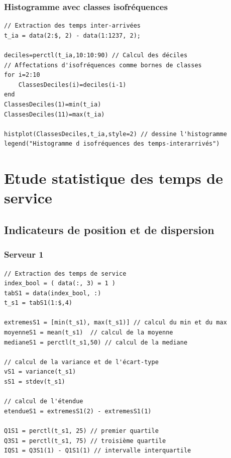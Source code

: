 \documentclass{article}
\begin{document}
\subsubsection{Histogramme avec classes isofréquences}
\begin{verbatim}
// Extraction des temps inter-arrivées
t_ia = data(2:$, 2) - data(1:1237, 2);

deciles=perctl(t_ia,10:10:90) // Calcul des déciles
// Affectations d'isofréquences comme bornes de classes
for i=2:10
    ClassesDeciles(i)=deciles(i-1)
end
ClassesDeciles(1)=min(t_ia)
ClassesDeciles(11)=max(t_ia)

histplot(ClassesDeciles,t_ia,style=2) // dessine l'histogramme
legend("Histogramme d isofréquences des temps-interarrivés")
\end{verbatim}

\section{Etude statistique des temps de service}

\subsection{Indicateurs de position et de dispersion}

\subsubsection{Serveur 1}
\begin{verbatim}
// Extraction des temps de service
index_bool = ( data(:, 3) = 1 )
tabS1 = data(index_bool, :)
t_s1 = tabS1(1:$,4)

extremesS1 = [min(t_s1), max(t_s1)] // calcul du min et du max
moyenneS1 = mean(t_s1)  // calcul de la moyenne
medianeS1 = perctl(t_s1,50) // calcul de la mediane

// calcul de la variance et de l'écart-type
vS1 = variance(t_s1)
sS1 = stdev(t_s1)

// calcul de l'étendue
etendueS1 = extremesS1(2) - extremesS1(1)

Q1S1 = perctl(t_s1, 25) // premier quartile
Q3S1 = perctl(t_s1, 75) // troisième quartile
IQS1 = Q3S1(1) - Q1S1(1) // intervalle interquartile
\end{verbatim}
\end{document}

